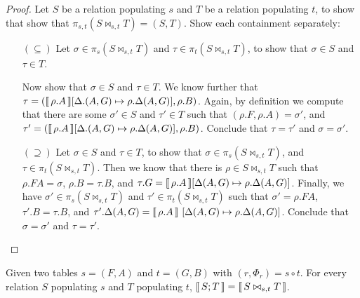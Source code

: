 \begin{proof}
  Let $S$ be a relation populating $s$ and $T$ be a relation
  populating $t$, to show that show that
  $ \pi_{s,t}(S \bowtie_{s,t}T) = (S,T)$. Show each containment
  separately:
  \begin{enumerate}[align=left]
  \item[$(\subseteq)$] Let $\sigma \in \pi_s(S \bowtie_{s,t} T)$ and
    $\tau \in \pi_t(S \bowtie_{s,t} T)$, to show that $\sigma \in S$
    and $\tau \in T$.

    Now show that $\sigma \in S$ and $\tau \in T$. We know further
    that
    $\tau = (\llbracket\,\rho.A\,\rrbracket[\Delta.(A,G) \mapsto \rho.\Delta(A,G)],
    \rho.B)$. Again, by definition we compute that there are some
    $\sigma' \in S$ and $\tau' \in T$ such that
    $(\rho.F,\rho.A) = \sigma'$, and
    $\tau' = (\llbracket\,\rho.A\,\rrbracket[\Delta.(A,G) \mapsto \rho.\Delta(A,G)],
    \rho.B)$. Conclude that $\tau = \tau'$ and $\sigma = \sigma'$. \hfill \checkmark

  \item[$(\supseteq)$] Let $\sigma \in S$ and $\tau \in T$, to show
    that $\sigma \in \pi_s(S \bowtie_{s,t}T)$, and
    $\tau \in \pi_t(S \bowtie_{s,t} T)$.  Then we know that there is
    $\rho \in S\bowtie_{s,t}T$ such that $\rho.FA = \sigma$,
    $\rho.B = \tau.B$, and
    $\tau.G = \llbracket\,\rho.A\,\rrbracket[\Delta(A,G) \mapsto \rho.\Delta(A,G)]$.
    Finally, we have $\sigma' \in \pi_s(S \bowtie_{s,t}T)$ and
    $\tau' \in \pi_t(S \bowtie_{s,t} T)$ such that
    $\sigma' = \rho.FA$, $\tau'.B = \tau.B$, and
    $\tau'.\Delta(A,G) = \llbracket\,\rho.A\,\rrbracket~[\Delta(A,G) \mapsto
      \rho.\Delta(A,G)]$. Conclude that $\sigma = \sigma'$ and $\tau = \tau'$. \hfill \checkmark
  \end{enumerate}
\end{proof}



\begin{theorem}
  \label{thm:comp-func-equiv}
  Given two tables $s = (F,A)$ and $t = (G,B)$ with
  $(r, \Phi_r) = s \circ t$. For every relation $S$ populating $s$ and
  $T$ populating $t$, $\llbracket\,S;T\,\rrbracket = \llbracket\,S\bowtie_{s,t}T\,\rrbracket$.
\end{theorem}

